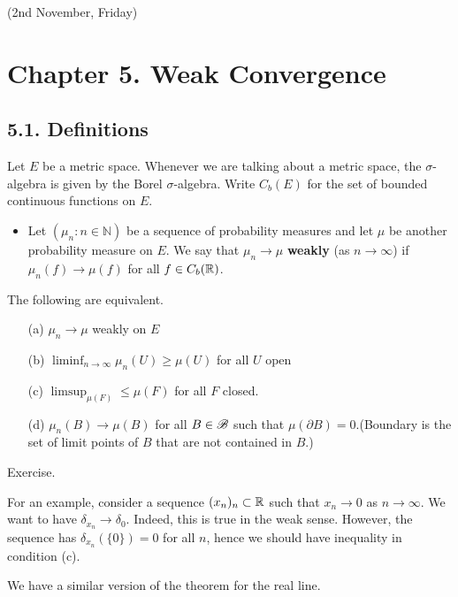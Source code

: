 \documentclass[12pt,a4paper]{report}
\newenvironment{proof}
{\begin{changemargin}{1cm}{0.5cm} 
	}%
	{\end{changemargin}
}
\begin{document}
\newday

(2nd November, Friday)

\section*{Chapter 5. Weak Convergence}

\subsection*{5.1. Definitions}

Let $E$ be a metric space. Whenever we are talking about a metric space, the $\sigma$-algebra is given by the Borel $\sigma$-algebra. Write $C_b(E)$ for the set of bounded continuous functions on $E$.
\begin{itemize}
\item Let $(\mu_n :n\in \mathbb{N})$ be a sequence of probability measures and let $\mu$ be another probability measure on $E$. We say that $\mu_n \rightarrow \mu$ \textbf{weakly} (as $n\rightarrow \infty$) if $\mu_n (f) \rightarrow \mu(f)$ for all $f\in C_b(\mathbb{R})$.
\end{itemize}
\s

 The following are equivalent.
\begin{itemize}
\item[(a)] $\mu_n \rightarrow \mu$ weakly on $E$
\item[(b)] $\liminf_{n\rightarrow \infty} \mu_n(U) \geq \mu(U)$ for all $U$ open
\item[(c)] $\limsup_{\mu(F)} \leq \mu(F)$ for all $F$ closed.
\item[(d)] $\mu_n(B) \rightarrow \mu(B)$ for all $B \in \mathscr{B}$ such that $\mu(\partial B)=0$.(Boundary is the set of limit points of $B$ that are not contained in $B$.)
\end{itemize}
\begin{proof}
\pf Exercise.
\end{proof}
\s

For an example, consider a sequence $(x_n)_n \subset \mathbb{R}$ such that $x_n \rightarrow 0$ as $n\rightarrow \infty$. We want to have $\delta_{x_n} \rightarrow \delta_0$. Indeed, this is true in the weak sense. However, the sequence has $\delta_{x_n}(\{0\}) =0$ for all $n$, hence we should have inequality in condition (c).
\s

We have a similar version of the theorem for the real line.
\s
\end{document}
